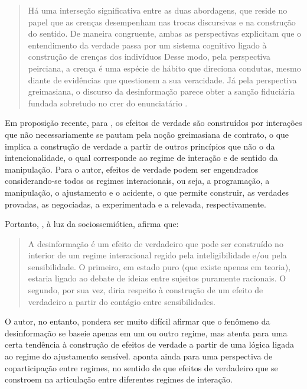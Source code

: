 \documentclass[portuguese]{textolivre}
\begin{document}
\begin{quote}
    Há uma interseção significativa entre as duas abordagens, que reside no papel que as crenças desempenham nas trocas discursivas e na construção do sentido. De maneira congruente, ambas as perspectivas explicitam que o entendimento da verdade passa por um sistema cognitivo ligado à construção de crenças dos indivíduos Desse modo, pela perspectiva peirciana, a crença é uma espécie de hábito que direciona condutas, mesmo diante de evidências que questionem a sua veracidade. Já pela perspectiva greimasiana, o discurso da desinformação parece obter a sanção fiduciária fundada sobretudo no crer do enunciatário \cite[p. 13]{ribeiro2022}.
\end{quote}

Em proposição recente, para \textcite{landowski2022}, os efeitos de verdade são construídos por interações que não necessariamente se pautam pela noção greimasiana de contrato, o que implica a construção de verdade a partir de outros princípios que não o da intencionalidade, o qual corresponde ao regime de interação e de sentido da manipulação. Para o autor, efeitos de verdade podem ser engendrados considerando-se todos os regimes interacionais, ou seja, a programação, a manipulação, o ajustamento e o acidente, o que permite construir, as verdades provadas, as negociadas, a experimentada e a relevada, respectivamente. 

Portanto, \textcite[p. 8]{mendes2025}, à luz da sociossemiótica, afirma que:

\begin{quote}
    A desinformação é um efeito de verdadeiro que pode ser construído no interior de um regime interacional regido pela inteligibilidade e/ou pela sensibilidade. O primeiro, em estado puro (que existe apenas em teoria), estaria ligado ao debate de ideias entre sujeitos puramente racionais. O segundo, por sua vez, diria respeito à construção de um efeito de verdadeiro a partir do contágio entre sensibilidades.
\end{quote}

O autor, no entanto, pondera ser muito difícil afirmar que o fenômeno da desinformação se baseie apenas em um ou outro regime, mas atenta para uma certa tendência à construção de efeitos de verdade a partir de uma lógica ligada ao regime do ajustamento sensível. \textcite{mendes2025} aponta ainda para uma perspectiva de coparticipação entre regimes, no sentido de que efeitos de verdadeiro que se constroem na articulação entre diferentes regimes de interação. 
\end{document}
